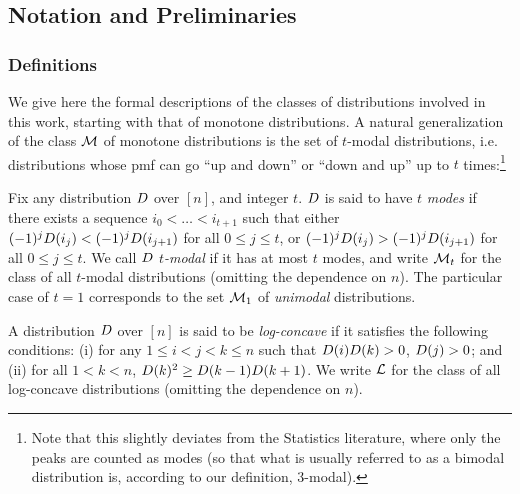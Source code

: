 \subsection{Notation and Preliminaries}\label{sec:preliminaries}
  \subsubsection{Definitions}\label{ssec:class:definitions}

We give here the formal descriptions of the classes of distributions involved in this work, starting with that of monotone distributions.
 A natural generalization of the class $\mathcal{M}$ of monotone distributions is the set of $t$-modal distributions, i.e. distributions whose pmf can go ``up and down'' or ``down and up'' up to $t$ times:\footnote{Note that this slightly deviates from the Statistics literature, where only the peaks are counted as modes (so that what is usually referred to as a bimodal distribution is, according to our definition, $3$-modal).
}

\begin{definition}[$t$-modal]\label{def:tmodal}
  Fix any distribution $D$ over $[n]$, and integer $t$. $D$ is said to have $t$ \emph{modes} if there exists a sequence $i_0 < \dots < i_{t+1}$ such 
  that either $(-1)^j D(i_j) < (-1)^j D(i_{j+1})$ for all $0\leq j \leq t$, or $(-1)^j D(i_j) > (-1)^j D(i_{j+1})$ for all $0\leq j \leq t$. We call $D$ \emph{$t$-modal} if it has at most $t$ modes, and write $\mathcal{M}_{t}$ for the class of all $t$-modal distributions (omitting the dependence on $n$). The particular case of $t=1$ corresponds to the set $\mathcal{M}_{1}$ of \emph{unimodal} distributions.
\end{definition}

\begin{definition}\label{def:logconcave}
  A distribution $D$ over $[n]$ is said to be \emph{log-concave} if it satisfies the following conditions: \textsf{(i)} for any $1 \leq i < j < k \leq n$ such that $D(i)D(k) > 0$, $D(j) > 0$; and \textsf{(ii)} for all $1 < k < n$, $D(k)^2 \geq D(k-1)D(k+1)$. We write $\mathcal{L}$ for the class of all log-concave distributions (omitting the dependence on $n$).
\end{definition}

